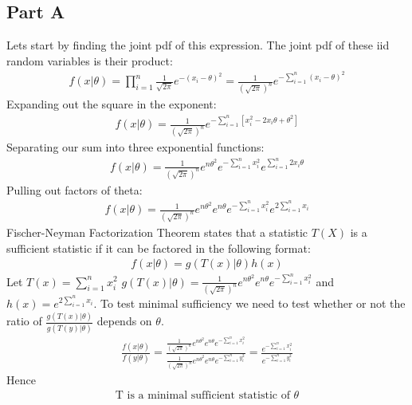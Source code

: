 \documentclass{article}
\begin{document}
\subsection*{Part A}
Lets start by finding the joint pdf of this expression. The joint pdf of these iid random variables is their product:
\begin{align*}
f(x|\theta) = \prod_{i=1}^{n} \frac{1}{\sqrt{2\pi}} e^{-(x_i-\theta)^2} = \frac{1}{(\sqrt{2\pi})^n} e^{-\sum_{i=1}^{n}(x_i-\theta)^2}
\end{align*}
Expanding out the square in the exponent:
\begin{align*}
f(x|\theta) = \frac{1}{(\sqrt{2\pi})^n} e^{-\sum_{i=1}^{n} [x_i^2 - 2x_i\theta + \theta^2]}
\end{align*}
Separating our sum into three exponential functions:
\begin{align*}
f(x|\theta) = \frac{1}{(\sqrt{2\pi})^n}  e^{n\theta^2} e^{-\sum_{i=1}^{n} x_i^2} e^{\sum_{i=1}^{n} 2x_i\theta}
\end{align*}
Pulling out factors of theta:
\begin{align*}
f(x|\theta) = \frac{1}{(\sqrt{2\pi})^n}  e^{n\theta^2} e^{n\theta}  e^{-\sum_{i=1}^{n} x_i^2} e^{2\sum_{i=1}^{n} x_i}
\end{align*}
Fischer-Neyman Factorization Theorem states that a statistic $T(X)$ is a sufficient statistic if it can be factored in the following format:
\begin{align*}
f(x|\theta) = g(T(x)|\theta)h(x)
\end{align*}
Let $T(x)=\sum_{i=1}^{n} x_i^2$ $g(T(x)|\theta)=\frac{1}{(\sqrt{2\pi})^n}  e^{n\theta^2} e^{n\theta}  e^{-\sum_{i=1}^{n} x_i^2}$ and $h(x) = e^{2\sum_{i=1}^{n} x_i}$. To test minimal sufficiency we need to test whether or not the ratio of $\frac{g(T(x)|\theta)}{g(T(y)|\theta)}$ depends on $\theta$.
\begin{align*}
\frac{f(x|\theta)}{f(y|\theta)} = \frac{\frac{1}{(\sqrt{2\pi})^n}  e^{n\theta^2} e^{n\theta}  e^{-\sum_{i=1}^{n} x_i^2}}{\frac{1}{(\sqrt{2\pi})^n}  e^{n\theta^2} e^{n\theta}  e^{-\sum_{i=1}^{n} y_i^2}} = \frac{e^{-\sum_{i=1}^{n} x_i^2}}{e^{-\sum_{i=1}^{n} y_i^2}}
\end{align*}
Hence
\begin{align*}
\boxed{ \text{T is a minimal sufficient statistic of } \theta}
\end{align*}
\end{document}
